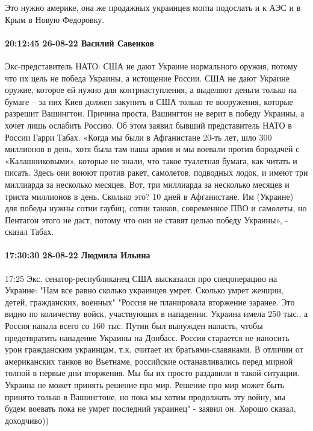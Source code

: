 Это нужно америке, она же продажных украинцев могла подослать и к АЭС и в Крым
в Новую Федоровку.


\paragraph{20:12:45 26-08-22 Василий Савенков}

Экс-представитель НАТО: США не дают Украине нормального оружия, потому что их цель не победа Украины, а истощение России.
США не дают Украине оружие, которое ей нужно для контрнаступления, а выделяют деньги только на бумаге – за них Киев должен закупить в США только те вооружения, которые разрешит Вашингтон. Причина проста, Вашингтон не верит в победу Украины, а хочет лишь ослабить Россию.
Об этом заявил бывший представитель НАТО в России Гарри Табах.
«Когда мы были в Афганистане 20-ть лет, шло 300 миллионов в день, хотя была там наша армия и мы воевали против бородачей с «Калашниковыми», которые не знали, что такое туалетная бумага, как читать и писать. Здесь они воюют против ракет, самолетов, подводных лодок, и имеют три миллиарда за несколько месяцев. Вот, три миллиарда за несколько месяцев и триста миллионов в день. Сколько это? 10 дней в Афганистане. Им (Украине) для победы нужны сотни гаубиц, сотни танков, современное ПВО и самолеты, но Пентагон этого не даст, потому что они не ставят целью победу Украины», - сказал Табах.


\paragraph{17:30:30 28-08-22 Людмила Ильина}
17:25
Экс. сенатор-республиканец США высказался про спецоперацию на Украине:
"Нам все равно сколько украинцев умрет. Сколько умрет женщин, детей, гражданских, военных"
"Россия не планировала вторжение заранее. Это видно по количеству войск, участвующих в нападении. Украина имела 250 тыс., а Россия напала всего со 160 тыс.
Путин был вынужден напасть, чтобы предотвратить нападение Украины на Донбасс.
Россия старается не наносить урон гражданским украинцам, т.к. считает их братьями-славянами.
В отличии от американских танков во Вьетнаме, российские останавливались перед мирной толпой в первые дни вторжения. Мы бы их просто раздавили в такой ситуации.
Украина не может принять решение про мир. Решение про мир может быть принято только в Вашингтоне, но пока мы хотим продолжать эту войну, мы будем воевать пока не умрет последний украинец" - заявил он.
Хорошо сказал, доходчиво))


